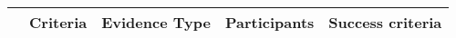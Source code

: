 

\begin{table*}
  \centering
\begin{tabular}{|c|p{20mm}|p{33mm}|p{33mm}|p{33mm}|}
   \hline
   & \textbf{Criteria} & \textbf{Evidence Type} & \textbf{Participants} & \textbf{Success criteria}\\
  \hline


\end{tabular}
\end{table*}

